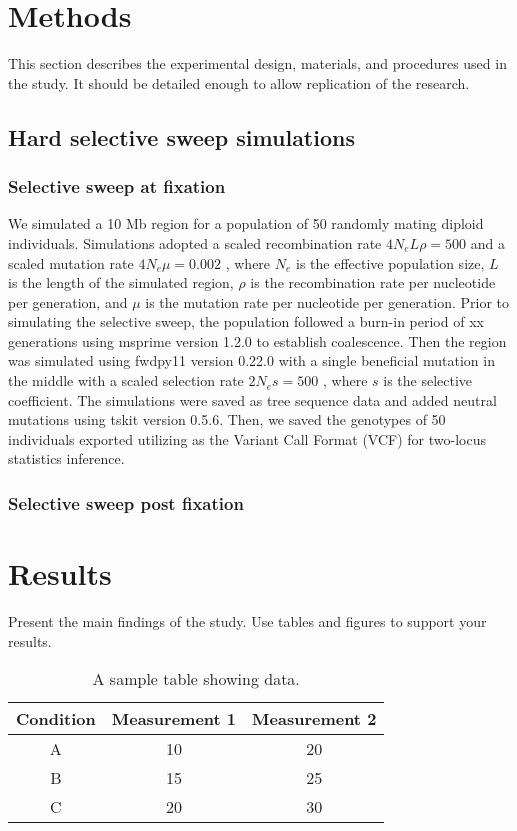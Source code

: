 \documentclass[12pt]{article}
\begin{document}
\section{Methods}
This section describes the experimental design, materials, and procedures used in the study. It should be detailed enough to allow replication of the research.

\subsection{Hard selective sweep simulations}
\subsubsection{Selective sweep at fixation}
We simulated a 10 Mb region for a population of 50 randomly mating diploid individuals. Simulations adopted a scaled recombination rate $4N_eL\rho = 500$ and a scaled mutation rate $4N_e\mu = 0.002$ \cite{KimNeilsen04}, where $N_e$ is the effective population size, $L$ is the length of the simulated region, $\rho$ is the recombination rate per nucleotide per generation, and $\mu$ is the mutation rate per nucleotide per generation. Prior to simulating the selective sweep, the population followed a burn-in period of xx generations using msprime \cite{msprime} version 1.2.0 to establish coalescence. Then the region was simulated using fwdpy11 \cite{} version 0.22.0 with a single beneficial mutation in the middle with a scaled selection rate $2N_es = 500$ \cite{KimNeilsen04}, where $s$ is the selective coefficient. The simulations were saved as tree sequence data and added neutral mutations using tskit \cite{} version 0.5.6. Then, we saved the genotypes of 50 individuals exported utilizing as the Variant Call Format (VCF) for two-locus statistics inference.

\subsubsection{Selective sweep post fixation}



\section{Results}
Present the main findings of the study. Use tables and figures to support your results.

\begin{table}[h!]
    \centering
    \begin{tabular}{|c|c|c|}
        \hline
        Condition & Measurement 1 & Measurement 2 \\
        \hline
        A & 10 & 20 \\
        B & 15 & 25 \\
        C & 20 & 30 \\
        \hline
    \end{tabular}
    \caption{A sample table showing data.}
    \label{tab:results}
\end{table}
\end{document}
